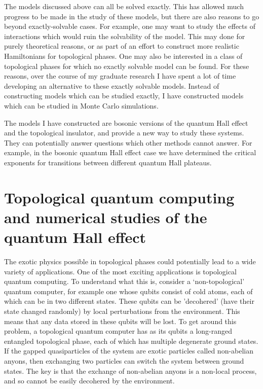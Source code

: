 The models discussed above can all be solved exactly. This has allowed much progress to be made in the study of these models, but there are also reasons to go beyond exactly-solvable cases. For example, one may want to study the effects of interactions which would ruin the solvability of the model. This may done for purely theoretical reasons, or as part of an effort to construct more realistic Hamiltonians for topological phases. One may also be interested in a class of topological phases for which no exactly solvable model can be found. For these reasons, over the course of my graduate research I have spent a lot of time developing an alternative to these exactly solvable models. Instead of constructing models which can be studied exactly, I have constructed models which can be studied in Monte Carlo simulations. 

The models I have constructed are bosonic versions of the quantum Hall effect and the topological insulator, and provide a new way to study these systems. They can potentially answer questions which other methods cannot answer. For example, in the bosonic quantum Hall effect case we have determined the critical exponents for transitions between different quantum Hall plateaus. 

\section{Topological quantum computing and numerical studies of the quantum Hall effect}

The exotic physics possible in topological phases could potentially lead to a wide variety of applications. One of the most exciting applications is topological quantum computing. To understand what this is, consider a `non-topological' quantum computer, for example one whose qubits consist of cold atoms, each of which can be in two different states. These qubits can be 'decohered' (have their state changed randomly) by local perturbations from the environment. This means that any data stored in these qubits will be lost. To get around this problem, a topological quantum computer has as its qubits a long-ranged entangled topological phase, each of which has multiple degenerate ground states. If the gapped quasiparticles of the system are exotic particles called non-abelian anyons, then exchanging two particles can switch the system between ground states. The key is that the exchange of non-abelian anyons is a non-local process, and so cannot be easily decohered by the environment. 

